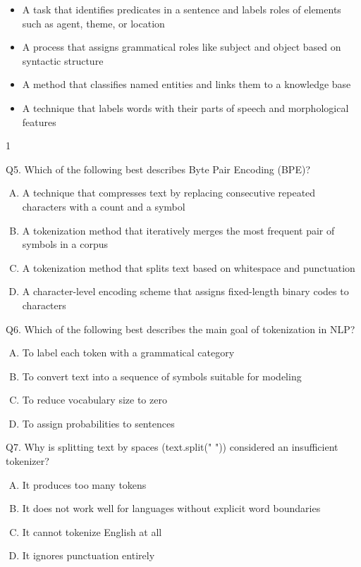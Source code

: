 \documentclass[11pt]{article}
\begin{document}
\begin{itemize}
\item[(A)] A task that identifies predicates in a sentence and labels roles of elements such as agent, theme, or location
\item[(B)] A process that assigns grammatical roles like subject and object based on syntactic structure
\item[(C)] A method that classifies named entities and links them to a knowledge base
\item[(D)] A technique that labels words with their parts of speech and morphological features
\end{itemize}

\begin{center}
1
\end{center}

\clearpage

Q5. Which of the following best describes Byte Pair Encoding (BPE)?

\begin{enumerate}[(A)]
\item A technique that compresses text by replacing consecutive repeated characters with a count and a symbol
\item A tokenization method that iteratively merges the most frequent pair of symbols in a corpus
\item A tokenization method that splits text based on whitespace and punctuation
\item A character-level encoding scheme that assigns fixed-length binary codes to characters
\end{enumerate}

Q6. Which of the following best describes the main goal of tokenization in NLP?

\begin{enumerate}[(A)]
\item To label each token with a grammatical category
\item To convert text into a sequence of symbols suitable for modeling
\item To reduce vocabulary size to zero
\item To assign probabilities to sentences
\end{enumerate}

Q7. Why is splitting text by spaces (text.split(" ")) considered an insufficient tokenizer?

\begin{enumerate}[(A)]
\item It produces too many tokens
\item It does not work well for languages without explicit word boundaries
\item It cannot tokenize English at all
\item It ignores punctuation entirely
\end{enumerate}
\end{document}
